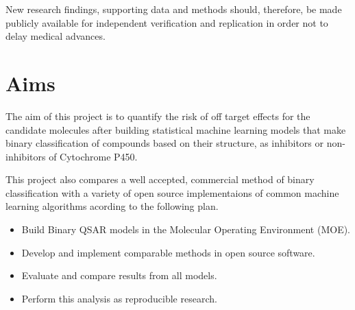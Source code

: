 New research findings, supporting data and methods should, therefore, be made publicly available for independent verification and replication in order not to delay medical advances.

\section{Aims}
The aim of this project is to quantify the risk of off target effects for the candidate molecules after building statistical machine learning models that make binary classification of compounds based on their structure, as inhibitors or non-inhibitors of Cytochrome P450.

This project also compares a well accepted, commercial method of binary classification with a variety of open source implementaions of common machine learning algorithms acording to the following plan.

\begin{itemize}

\item Build Binary QSAR models in the Molecular Operating Environment (MOE).

\item Develop and implement comparable methods in open source software.

\item Evaluate and compare results from all models.

\item Perform this analysis as reproducible research.

\end{itemize}

